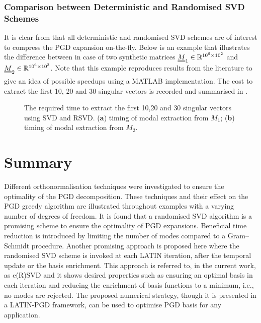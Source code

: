 \subsubsection{Comparison between Deterministic and Randomised SVD Schemes}

It is clear from  that all deterministic and randomised SVD schemes are of interest to compress the PGD expansion on-the-fly. Below is an example that illustrates the difference between  in case of two synthetic matrices $\underline{\underline{M}}_1 \in {\mathbb{ R}}^{10^{6}\times10^{2}}$ and $\underline{\underline{M}}_2 \in {\mathbb{ R}}^{10^{6}\times10^{3}}$. Note that this example reproduces results from the literature to give an idea of possible speedups using a MATLAB\textsuperscript{\textregistered} implementation. The cost to extract the first 10, 20 and 30 singular vectors is recorded and summarised in .

\begin{figure}[hbt!]
	\centering
	\begin{subfigure}[t]{0.49\linewidth}
		
		\caption{}
	\end{subfigure}
	\hfil
	\begin{subfigure}[t]{0.49\linewidth}
		
		\caption{}
	\end{subfigure}
	\caption{The required time to extract the first 10,20 and 30 singular vectors using SVD and RSVD. (\textbf{a}) timing of modal extraction from $M_1$; (\textbf{b}) timing of modal extraction from $M_2$.}
	\label{fig_synthetic_matrix_svd}
\end{figure}

\section{Summary}
\label{sec_conclusion}

Different orthonormalisation techniques were investigated to ensure the optimality of the PGD decomposition. These techniques and their effect on the PGD greedy algorithm are illustrated throughout examples with a varying number of degrees of freedom. It is found that a randomised SVD algorithm is a promising scheme to ensure the optimality of PGD expansions. Beneficial time reduction is introduced by limiting the number of modes compared to a Gram--Schmidt procedure. Another promising approach is proposed here where the randomised SVD scheme is invoked at each LATIN iteration, after the temporal update or the basis enrichment. This approach is referred to, in the current work, as e(R)SVD and it shows desired properties such as ensuring an optimal basis in each iteration and {reducing the enrichment of basis functions to a minimum}, i.e., no modes are rejected. The proposed numerical strategy, though it is presented in a LATIN-PGD framework, can be used to optimise PGD basis for any application.


